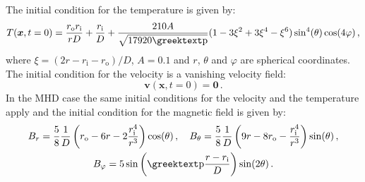 The initial condition for the temperature is given by:
\begin{equation}
	T(\bm{x},t=\num{0})=\frac{r_\mathrm{o}r_\mathrm{i}}{rD}+\frac{r_\mathrm{i}}{D}+\frac{210A}{\sqrt{17920\gpi}}(1-3\xi^2+3\xi^4-\xi^6)\sin^4(\theta)\cos(4\varphi)\,,
\end{equation}
where $\xi=(2r-r_\mathrm{i}-r_\mathrm{o})/D$, $A=\num{0.1}$ and $r$, $\theta$ and $\varphi$ are spherical coordinates. The initial condition for the velocity is a vanishing velocity field:
\begin{equation}
	\bm{v}(\bm{x},t=\num{0})=\bm{0}\,.
\end{equation}
In the MHD case the same initial conditions for the velocity and the temperature apply and the initial condition for the magnetic field is given by:
\begin{equation}
\begin{gathered}
	B_r=\frac{5}{8}\frac{1}{D}\left(r_\mathrm{o}-6r-2\frac{r_\mathrm{i}^4}{r^3}\right)\cos(\theta)\,,\quad
	B_\theta=\frac{5}{8}\frac{1}{D}\left(9r-8r_\mathrm{o}-\frac{r_\mathrm{i}^4}{r^3}\right)\sin(\theta)\,,\\
	B_\varphi=5\sin\left(\gpi\frac{r-r_\mathrm{i}}{D}\right)\sin(2\theta)\,.
\end{gathered}
\end{equation}
